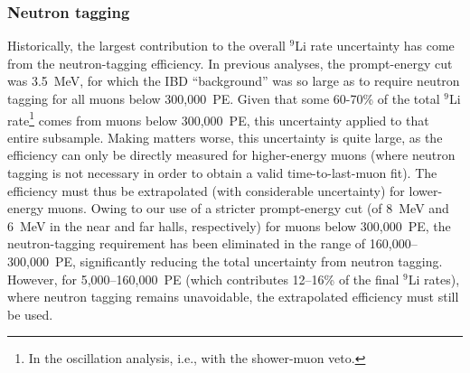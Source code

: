 \documentclass[../thesis.tex]{subfiles}
\begin{document}

\subsubsection{Neutron tagging}
\label{sec:bkgLi9NeuTagEff}

Historically, the largest contribution to the overall $^9$Li rate uncertainty has come from the neutron-tagging efficiency. In previous analyses, the prompt-energy cut was 3.5~MeV, for which the IBD ``background'' was so large as to require neutron tagging for all muons below 300,000~PE. Given that some 60-70\% of the total $^9$Li rate\footnote{In the oscillation analysis, i.e., with the shower-muon veto.} comes from muons below 300,000~PE, this uncertainty applied to that entire subsample. Making matters worse, this uncertainty is quite large, as the efficiency can only be directly measured for higher-energy muons (where neutron tagging is not necessary in order to obtain a valid time-to-last-muon fit). The efficiency must thus be extrapolated (with considerable uncertainty) for lower-energy muons. Owing to our use of a stricter prompt-energy cut (of 8~MeV and 6~MeV in the near and far halls, respectively) for muons below 300,000~PE, the neutron-tagging requirement has been eliminated in the range of 160,000--300,000~PE, significantly reducing the total uncertainty from neutron tagging. However, for 5,000--160,000~PE (which contributes 12--16\% of the final $^9$Li rates), where neutron tagging remains unavoidable, the extrapolated efficiency must still be used.
\end{document}

